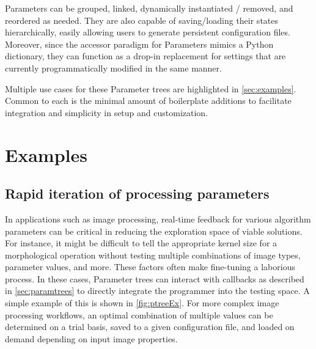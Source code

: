 \documentclass[journal]{vgtc}                %
\begin{document}
Parameters can be grouped, linked, dynamically instantiated / removed, and reordered as needed. They are also capable of saving/loading their states hierarchically, easily allowing users to generate persistent configuration files. Moreover, since the accessor paradigm for Parameters mimics a Python dictionary, they can function as a drop-in replacement for settings that are currently programmatically modified in the same manner.

Multiple use cases for these Parameter trees are highlighted in \autoref{sec:examples}. Common to each is the minimal amount of boilerplate additions to facilitate integration and simplicity in setup and customization.


\section{Examples}\label{sec:examples}

\subsection{Rapid iteration of processing parameters}
In applications such as image processing, real-time feedback for various algorithm parameters can be critical in reducing the exploration space of viable solutions. For instance, it might be difficult to tell the appropriate kernel size for a morphological operation without testing multiple combinations of image types, parameter values, and more. These factors often make fine-tuning a laborious process. In these cases, Parameter trees can interact with callbacks as described in \autoref{sec:paramtrees} to directly integrate the programmer into the testing space. A simple example of this is shown in \autoref{fig:ptreeEx}. For more complex image processing workflows, an optimal combination of multiple values can be determined on a trial basis, saved to a given configuration file, and loaded on demand depending on input image properties.
\makePtreeExFig
\end{document}
